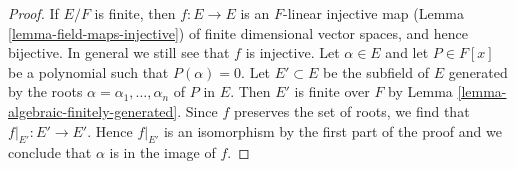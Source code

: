 \begin{proof}
If $E/F$ is finite, then $f : E \to E$ is an $F$-linear
injective map (Lemma \ref{lemma-field-maps-injective})
of finite dimensional vector spaces, and hence bijective.
In general we still see that $f$ is injective.
Let $\alpha \in E$ and let $P \in F[x]$ be a
polynomial such that $P(\alpha) = 0$.
Let $E' \subset E$ be the subfield of $E$ generated
by the roots $\alpha = \alpha_1, \ldots, \alpha_n$ of $P$ in $E$.
Then $E'$ is finite over $F$ by Lemma \ref{lemma-algebraic-finitely-generated}.
Since $f$ preserves the set of roots, we find that
$f|_{E'} : E' \to E'$. Hence $f|_{E'}$ is an isomorphism
by the first part of the proof and we conclude that $\alpha$
is in the image of $f$.
\end{proof}






